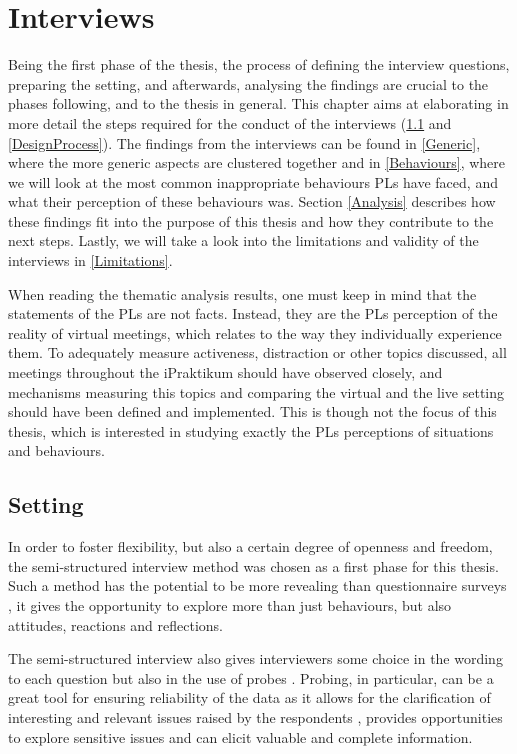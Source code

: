 \chapter{Interviews}

Being the first phase of the thesis, the process of defining the interview questions, preparing the setting, and afterwards, analysing the findings are crucial to the phases following, and to the thesis in general. This chapter aims at elaborating in more detail the steps required for the conduct of the interviews (\ref{Setting} and \ref{DesignProcess}). The findings from the interviews can be found in \ref{Generic}, where the more generic aspects are clustered together and in \ref{Behaviours}, where we will look at the most common inappropriate behaviours PLs have faced, and what their perception of these behaviours was. Section \ref{Analysis} describes how these findings fit into the purpose of this thesis and how they contribute to the next steps. Lastly, we will take a look into the limitations and validity of the interviews in \ref{Limitations}.

When reading the thematic analysis results, one must keep in mind that the statements of the PLs are not facts. Instead, they are the PLs perception of the reality of virtual meetings, which relates to the way they individually experience them. To adequately measure activeness, distraction or other topics discussed, all meetings throughout the iPraktikum should have observed closely, and mechanisms measuring this topics and comparing the virtual and the live setting should have been defined and implemented. This is though not the focus of this thesis, which is interested in studying exactly the PLs perceptions of situations and behaviours.

\section{Setting}\label{Setting}

In order to foster flexibility, but also a certain degree of openness and freedom, the semi-structured interview method was chosen as a first phase for this thesis. Such a method has the potential to be more revealing than questionnaire surveys \cite{Barriball1994}, it gives the opportunity to explore more than just behaviours, but also attitudes, reactions and reflections. 

The semi-structured interview also gives interviewers some choice in the wording to each question but also in the use of probes \cite{Hutchinson1992}. Probing, in particular, can be a great tool for ensuring reliability of the data as it allows for the clarification of interesting and relevant issues raised by the respondents  \cite{Hutchinson1992}, provides opportunities to explore sensitive issues \cite{NayBrock1984} and can elicit valuable and complete information.

